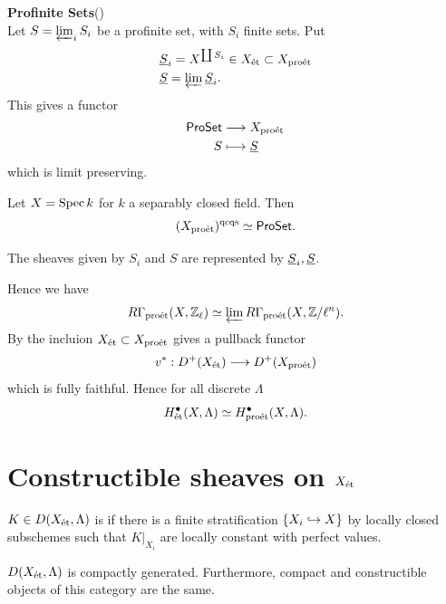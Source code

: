 \documentclass[oneside]{amsart}
\begin{document}
\textbf{Profinite Sets}(\cite[Example 4.1.9]{BS})\\
Let $S=\varprojlim_i S_i$ be a profinite set, with $S_i$ finite sets. Put
\begin{align*}
	&\underline{S}_i = X^{\coprod S_i}\in X_{\mathrm{\acute{e}t}} \subset X_{\mathrm{pro\acute{e}t}} \\
	&\underline{S} = \varprojlim \underline{S}_i.
\end{align*}
This gives a functor
\begin{align*}
	\mathsf{ProSet} &\longrightarrow X_{\mathrm{pro\acute{e}t}} \\
	S &\longmapsto \underline{S}
\end{align*}
which is limit preserving.

\begin{example}
	Let $X=\operatorname{Spec} k$ for $k$ a separably closed field. Then
	\[
		(X_{\mathrm{pro\acute{e}t}})^{\text{qcqs}}\simeq \mathsf{ProSet}.
	\]
\end{example}
\begin{remark}
	The sheaves given by $S_i$ and $S$ are represented by $\underline{S}_i,\underline{S}$.
\end{remark}
Hence we have
\[
	R\Gamma_{\mathrm{pro\acute{e}t}}(X,\mathbb Z_\ell) \simeq \varprojlim R\Gamma_{\mathrm{pro\acute{e}t}}(X,\mathbb Z /\ell^{n}).
\]
By \cite[Corollary 5.1.6]{BS} the incluion $X_{\mathrm{\acute{e}t}}\subset X_{\mathrm{pro\acute{e}t}}$ gives a pullback functor
\[
	v^{*}:D^{+}(X\et) \to D^{+}(X\proet)
\]
which is fully faithful. Hence for all discrete $\Lambda$
\[
	H^{\bullet}_{\mathrm{\acute{e}t}}(X,\Lambda) \simeq H^{\bullet}_{\mathrm{pro\acute{e}t}}(X,\Lambda).
\]
\section{\texorpdfstring{Constructible sheaves on $X_{\mathrm{\acute{e}t}}$}{Constructible sheaves on Xet}}
\begin{definition}[{\cite[Definition 6.3.1]{BS}}]
	$K\in D(X_{\mathrm{\acute{e}t}},\Lambda)$ is  if there is a finite stratification
	$\{X_i\hookrightarrow X\} $ by locally closed subschemes such that $K|_{X_i}$ are locally
	constant with perfect values.
\end{definition}
\begin{proposition}[{\cite[Proposition 6.4.8]{BS}}]
	$D(X_{\mathrm{\acute{e}t}},\Lambda)$ is compactly generated. Furthermore, compact and constructible objects
	of this category are the same.
\end{proposition}
\end{document}
